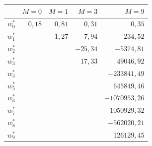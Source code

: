 \begin{tabular}{lrrrr}
\toprule
 & $M=0$ & $M=1$ & $M=3$ & $M=9$ \\
\midrule
$w_0^*$ & $0{,}18$ & $0{,}81$ & $0{,}31$ & $0{,}35$ \\
$w_1^*$ &  & $-1{,}27$ & $7{,}94$ & $234{,}52$ \\
$w_2^*$ &  &  & $-25{,}34$ & $-5374{,}81$ \\
$w_3^*$ &  &  & $17{,}33$ & $49046{,}92$ \\
$w_4^*$ &  &  &  & $-233841{,}49$ \\
$w_5^*$ &  &  &  & $645849{,}46$ \\
$w_6^*$ &  &  &  & $-1070953{,}26$ \\
$w_7^*$ &  &  &  & $1050929{,}32$ \\
$w_8^*$ &  &  &  & $-562020{,}21$ \\
$w_9^*$ &  &  &  & $126129{,}45$ \\
\bottomrule
\end{tabular}
